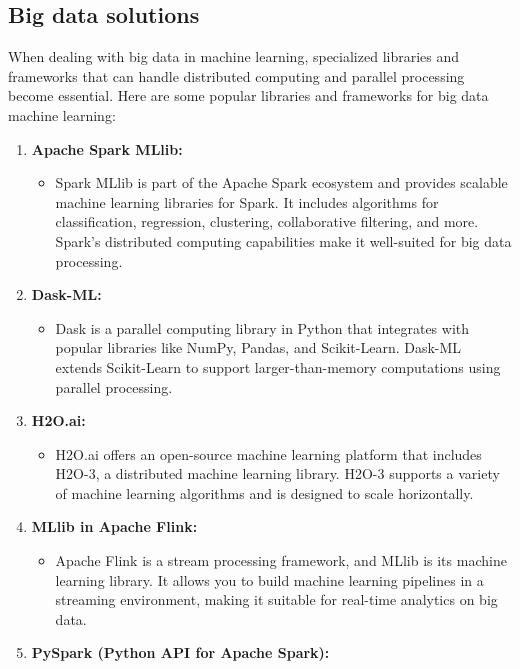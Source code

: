 \documentclass[
]{book}
\providecommand{\tightlist}{%
  \setlength{\itemsep}{0pt}\setlength{\parskip}{0pt}}
\begin{document}
\hypertarget{big-data-solutions}{%
\subsection{Big data solutions}\label{big-data-solutions}}

When dealing with big data in machine learning, specialized libraries and frameworks that can handle distributed computing and parallel processing become essential. Here are some popular libraries and frameworks for big data machine learning:

\begin{enumerate}
\def\labelenumi{\arabic{enumi}.}
\tightlist
\item
  \textbf{Apache Spark MLlib:}

  \begin{itemize}
  \tightlist
  \item
    Spark MLlib is part of the Apache Spark ecosystem and provides scalable machine learning libraries for Spark. It includes algorithms for classification, regression, clustering, collaborative filtering, and more. Spark's distributed computing capabilities make it well-suited for big data processing.
  \end{itemize}
\item
  \textbf{Dask-ML:}

  \begin{itemize}
  \tightlist
  \item
    Dask is a parallel computing library in Python that integrates with popular libraries like NumPy, Pandas, and Scikit-Learn. Dask-ML extends Scikit-Learn to support larger-than-memory computations using parallel processing.
  \end{itemize}
\item
  \textbf{H2O.ai:}

  \begin{itemize}
  \tightlist
  \item
    H2O.ai offers an open-source machine learning platform that includes H2O-3, a distributed machine learning library. H2O-3 supports a variety of machine learning algorithms and is designed to scale horizontally.
  \end{itemize}
\item
  \textbf{MLlib in Apache Flink:}

  \begin{itemize}
  \tightlist
  \item
    Apache Flink is a stream processing framework, and MLlib is its machine learning library. It allows you to build machine learning pipelines in a streaming environment, making it suitable for real-time analytics on big data.
  \end{itemize}
\item
  \textbf{PySpark (Python API for Apache Spark):}


\end{enumerate}
\end{document}
